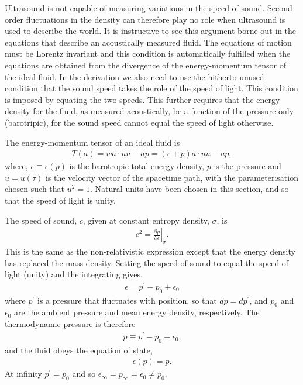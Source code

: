 \documentclass[10pt, fleqn,final,showtrims,oldfontcommands]{article} %
\newcommand{\eqal}[2]{\begin{align}#1\label{eqn:#2}\end{align}}
\newcommand{\epsillon}{\epsilon}
\renewcommand{\d}{\partial}
\newcommand{\given}[2]{ \left.{#1}\right|_{#2}  }
\begin{document}
Ultrasound is not capable of  measuring variations in the speed of sound.
Second order fluctuations in the density  can therefore play no role when ultrasound is used to describe the world.
It is instructive to see this argument borne out in the equations that describe an acoustically measured fluid.
The equations of motion must  be Lorentz invariant and this condition  is automatically fulfilled  when  the equations 
are obtained from the divergence of the energy-momentum tensor of the ideal fluid.
In the derivation we also need to use the hitherto unused  condition
that the sound speed takes the role  of the speed of light.
This condition is imposed by equating the two speeds.
This further requires that the energy density for the fluid, as measured acoustically, be a function of the pressure only (barotripic),
for the sound speed cannot equal the speed of light otherwise\cite{Taub1978}.

The energy-momentum tensor of an ideal fluid is\cite{Doran2003}
\eqal{
  T(a) = w a \cdot u u - a p = (\epsilon + p) a \cdot u u - a p,
}{EMtensor}
where, $\epsilon \equiv \epsilon(p)$ is the barotropic total energy density,
$p$ is the pressure
and 
$u=u(\tau)$ is the velocity vector of the spacetime path, with the parameterisation chosen such that $u^2 = 1$. %
Natural units have been chosen in this section, and so that the speed of light is unity.

The speed of sound, $c$,  given at constant entropy density, $\sigma$, is\cite{LandauBook,Taub1978} 
\begin{align}
  c^2 = \given{\frac{\d p}{\d \epsillon}}{\sigma}. \label{eqn:soundspeed}
\end{align}
This is the same as the non-relativistic expression except that the energy density has replaced the mass density.
Setting the speed of sound to equal the speed of light (unity) and the integrating 
 gives,
 \begin{align}
   \epsilon = p^\prime - p_0 + \epsilon_0
 \end{align} 
where $p^\prime$ is a pressure that fluctuates with position, so that $dp = dp^\prime$,
and $p_0$  and $\epsilon_0$  are the ambient  pressure and mean energy density, respectively.
The thermodynamic pressure is therefore
\begin{align}
  p \equiv p^\prime - p_0 + \epsilon_0. \label{eqn:pshort}
\end{align}
and the fluid obeys the equation of state, 
\eqal{
  \epsilon(p) = p.
}{eos}
At infinity $p^\prime = p_0$ 
and so $\epsilon_\infty = p_\infty = \epsilon_0 \ne p_0$.
\end{document}
